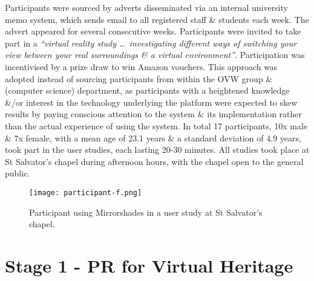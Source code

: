 Participants were sourced by adverts disseminated via an internal university memo system, which sends email to all registered staff \& students each week. The advert appeared for several consecutive weeks. Participants were invited to take part in a \textit{``virtual reality study \ldots\ investigating different ways of switching your view between your real surroundings \& a virtual environment''}. Participation was incentivised by a prize draw to win Amazon vouchers. This approach was adopted instead of sourcing participants from within the OVW group \& (computer science) department, as participants with a heightened knowledge \&/or interest in the technology underlying the platform were expected to skew results by paying conscious attention to the system \& its implementation rather than the actual experience of using the system. In total 17 participants, 10x male \& 7x female, with a mean age of 23.1 years \& a standard deviation of 4.9 years, took part in the user studies, each lasting 20-30 minutes. All studies took place at St Salvator's chapel during afternoon hours, with the chapel open to the general public.

\begin{figure}[ht]
	\begin{center}
		\texttt{[image: participant-f.png]}
		\caption{Participant using Mirrorshades in a user study at St Salvator's chapel.}
		\label{participant-f.png}
	\end{center}
\end{figure}


\section{Stage 1 - PR for Virtual Heritage}

